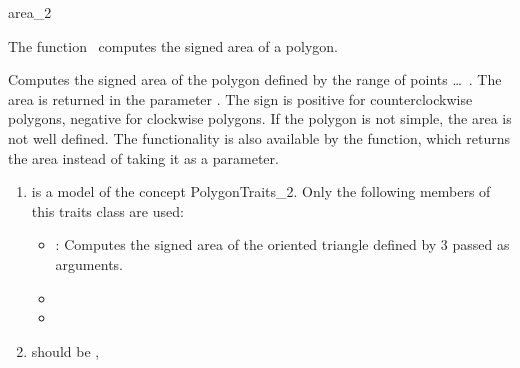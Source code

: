 

\begin{ccRefFunction}{area_2}  %


\ccDefinition
  
The function \ccRefName\ computes the signed area of a polygon.


{
Computes the signed area of the polygon defined by the range of points
 \ldots\ . The area is returned in the parameter
. The sign is positive for counterclockwise polygons, negative for
clockwise polygons. If the polygon is not simple, the area is not well defined.
The functionality is also available by the  function, which
returns the area instead of taking it as a parameter.
}

\begin{enumerate}
    \item {} is a model of the concept 
	  PolygonTraits\_2.
	  Only the following members of this traits class are used:
          \begin{itemize}
	    \item {} : Computes the signed area of the
	    oriented triangle defined by 3  passed as arguments.
            \item {}
            \item {}
          \end{itemize}
    \item {} should be ,
\end{enumerate}

\ccSeeAlso

 \\
 \\
 \\
 \\


\end{ccRefFunction}


